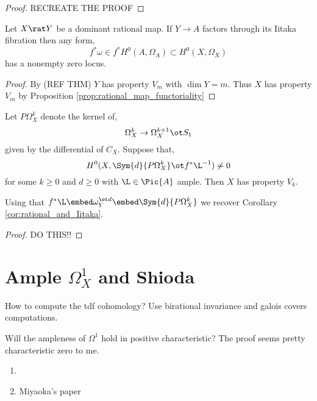 \documentclass[12pt]{article}
\begin{document}
\begin{proof}
RECREATE THE PROOF
\end{proof}

\begin{cor} \label{cor:rational_and_Iitaka}
Let $X \rat Y$ be a dominant rational map. If $Y \to A$ factors through its Iitaka fibration then any form,
\[ f^* \omega \in f^* H^0(A, \Omega_A) \subset H^0(X, \Omega_X) \]
has a nonempty zero locus.  
\end{cor}

\begin{proof}
By (REF THM) $Y$ has property $V_m$ with $\dim{Y} = m$. Thus $X$ has property $V_m$ by Proposition \ref{prop:rational_map_functoriality}
\end{proof}

\begin{theorem}
Let $P \Omega^k_X$ denote the kernel of,
\[ \Omega^k_X \to \Omega^{k+1}_X \ot S_1 \]
given by the differential of $C_X$. Suppose that,
\[ H^0(X, \Sym{d}{P \Omega^k_X} \ot f^* \L^{-1}) \neq 0 \]
for some $k \ge 0$ and $d \ge 0$ with $\L \in \Pic{A}$ ample. Then $X$ has property $V_k$. 
\end{theorem}

\begin{rmk}
Using that $f^* \L \embed \omega_Y^{\ot d} \embed \Sym{d}{P \Omega^k_X}$ we recover Corollary \ref{cor:rational_and_Iitaka}. 
\end{rmk}

\begin{proof}
DO THIS!!
\end{proof}



\section{Ample $\Omega^1_X$ and Shioda}

How to compute the tdf cohomology? Use birational invariance and galois covers computations.

Will the ampleness of $\Omega^1$ hold in positive characteristic? The proof seems pretty characteristic zero to me.

\begin{enumerate}
\item {}

\item Miyaoka's paper
\end{enumerate}
\end{document}
